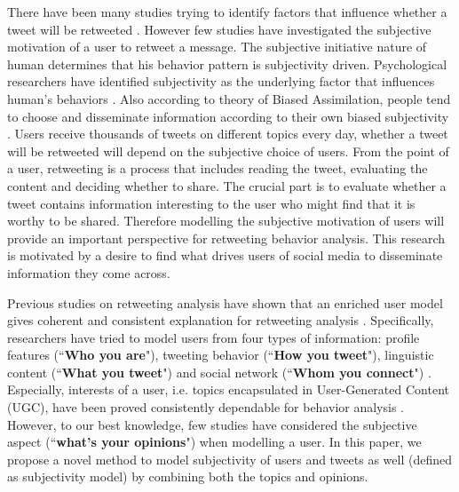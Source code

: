 \documentclass{acm_proc_article-sp}
\begin{document}
There have been many studies trying to identify factors that influence whether a tweet will be retweeted \cite{boyd2010tweet,kwak2010twitter}. However few studies have investigated the subjective motivation of a user to retweet a message. 
The subjective initiative nature of human determines that his behavior pattern is subjectivity driven. Psychological researchers have identified subjectivity as the underlying factor that influences human's behaviors \cite{moore2008awareness}. 
Also according to theory of Biased Assimilation, people tend to choose and disseminate information according to their own biased subjectivity \cite{Hyman2000}. 
Users receive thousands of tweets on different topics every day, whether a tweet will be retweeted will depend on the subjective choice of users. 
From the point of a user, retweeting is a process that includes reading the tweet, evaluating the content and deciding whether to share. The crucial part is to evaluate whether a tweet contains information interesting to the user who might find that it is worthy to be shared.  
Therefore modelling the subjective motivation of users will provide an important perspective for retweeting behavior analysis. 
This research is motivated by a desire to find what drives users of social media to disseminate information they come across. 

Previous studies on retweeting analysis have shown that an enriched user model gives coherent and consistent explanation for retweeting analysis \cite{macskassy2011people,feng2013retweet}. 
Specifically, researchers have tried to model users from four types of information:
profile features (``\textbf{Who you are}"), tweeting behavior (``\textbf{How you tweet}"), linguistic content (``\textbf{What you tweet}") and social network (``\textbf{Whom you connect}") \cite{pennacchiotti2011machine}. 
Especially, interests of a user, i.e. topics encapsulated in User-Generated Content (UGC), have been proved consistently dependable for behavior analysis \cite{petrovic2011rt}. 
However, to our best knowledge, few studies have considered the subjective aspect (``\textbf{what's your opinions}") when modelling a user. 
In this paper, we propose a novel method to model subjectivity of users and tweets as well (defined as subjectivity model) by combining both the topics and opinions. 
\end{document}
